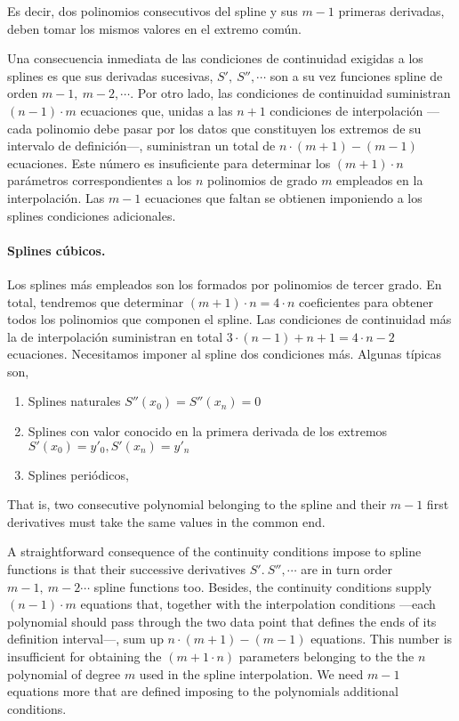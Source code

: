 \begin{paracol}{2}
Es decir, dos polinomios consecutivos del spline y sus $m-1$ primeras derivadas, deben tomar los mismos valores en el extremo común. 

Una consecuencia inmediata de las condiciones de continuidad exigidas a los splines es que sus derivadas sucesivas, $S',\ S'', \cdots$ son a su vez funciones spline de orden $m-1,\ m-2, \cdots$. Por otro lado, las condiciones de continuidad suministran  $(n-1)\cdot m$ ecuaciones que, unidas a las $n+1$ condiciones de interpolación ---cada polinomio debe pasar por los datos que constituyen los extremos de su intervalo de definición---,  suministran un total de  $n\cdot (m+1)-(m-1)$ ecuaciones. Este número es insuficiente para determinar los $(m+1)\cdot n$ parámetros correspondientes a los $n$ polinomios de grado $m$ empleados en la interpolación. Las $m-1$ ecuaciones que faltan se obtienen imponiendo a los splines condiciones adicionales.

\paragraph{Splines cúbicos.}  Los splines más empleados son los formados por polinomios de tercer grado. En total, tendremos que determinar $(m+1)\cdot n=4\cdot n$ coeficientes para obtener todos los polinomios que componen el spline. Las condiciones de continuidad más la de interpolación suministran en total $3\cdot (n-1)+n+1=4\cdot n-2$  ecuaciones. Necesitamos imponer al spline dos condiciones más. Algunas típicas son,
\begin{enumerate}
\item Splines naturales $S''(x_0)=S''(x_n)=0$
\item Splines con valor conocido en la primera derivada de los extremos $S'(x_0)=y'_0, S'(x_n)=y'_n$
\item Splines periódicos,
\end{enumerate}
\switchcolumn
That is, two consecutive polynomial belonging to the spline and their $m-1$ first derivatives must take the same values in the common end.

A straightforward consequence of the continuity conditions impose to spline functions is that their successive derivatives $S'.\ S'', \cdots$ are in turn order $m-1, \ m-2 \cdots$ spline functions too. Besides, the continuity conditions supply $(n-1) \cdot m$ equations that, together with the interpolation conditions ---each polynomial should pass through the two data point that defines the ends of its definition interval---, sum up $n\cdot (m+1)-(m-1)$ equations. This number is insufficient for obtaining the $(m+1\cdot n)$ parameters belonging to the the $n$ polynomial of degree $m$ used in the spline interpolation. We need $m-1$ equations more that are defined imposing to the polynomials additional conditions.


\end{paracol}

